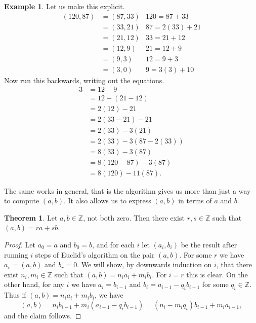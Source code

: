 \documentclass{article}
\newcommand{\Z}{\mathbb{Z}}
\newcommand{\rb}[1]{\left( #1 \right)}
\theoremstyle{definition}\newtheorem{definition}{Definition}
\theoremstyle{definition}\newtheorem*{remark}{Remark}
\theoremstyle{definition}\newtheorem*{example}{Example}
\theoremstyle{definition}\newtheorem*{note}{Note}
\newtheorem{theorem}[definition]{Theorem}
\begin{document}
\begin{example}
Let us make this explicit.
\begin{align*}
\rb{120, 87}
& = \rb{87, 33} & 120 = 87 + 33 \\
& = \rb{33, 21} & 87 = 2\rb{33} + 21 \\
& = \rb{21, 12} & 33 = 21 + 12 \\
& = \rb{12, 9} & 21 = 12 + 9 \\
& = \rb{9, 3} & 12 = 9 + 3 \\
& = \rb{3, 0} & 9 = 3\rb{3} + 10
\end{align*}
Now run this backwards, writing out the equations.
\begin{align*}
3
& = 12 - 9 \\
& = 12 - \rb{21 - 12} \\
& = 2\rb{12} - 21 \\
& = 2\rb{33 - 21} - 21 \\
& = 2\rb{33} - 3\rb{21} \\
& = 2\rb{33} - 3\rb{87 - 2\rb{33}} \\
& = 8\rb{33} - 3\rb{87} \\
& = 8\rb{120 - 87} - 3\rb{87} \\
& = 8\rb{120} - 11\rb{87}.
\end{align*}
\end{example}

The same works in general, that is the algorithm gives us more than just a way to compute $ \rb{a, b} $. It also allows us to express $ \rb{a, b} $ in terms of $ a $ and $ b $.

\begin{theorem}
\label{thm:6}
Let $ a, b \in \Z $, not both zero. Then there exist $ r, s \in \Z $ such that $ \rb{a, b} = ra + sb $.
\end{theorem}

\begin{proof}
Let $ a_0 = a $ and $ b_0 = b $, and for each $ i $ let $ \rb{a_i, b_i} $ be the result after running $ i $ steps of Euclid's algorithm on the pair $ \rb{a, b} $. For some $ r $ we have $ a_r = \rb{a, b} $ and $ b_r = 0 $. We will show, by downwards induction on $ i $, that there exist $ n_i, m_i \in \Z $ such that $ \rb{a, b} = n_ia_i + m_ib_i $. For $ i = r $ this is clear. On the other hand, for any $ i $ we have $ a_i = b_{i - 1} $ and $ b_i = a_{i - 1} - q_ib_{i - 1} $ for some $ q_i \in \Z $. Thus if $ \rb{a, b} = n_ia_i + m_ib_i $, we have
$$ \rb{a, b} = n_ib_{i - 1} + m_i\rb{a_{i - 1} - q_ib_{i - 1}} = \rb{n_i - m_iq_i}b_{i - 1} + m_ia_{i - 1}, $$
and the claim follows.
\end{proof}
\end{document}
